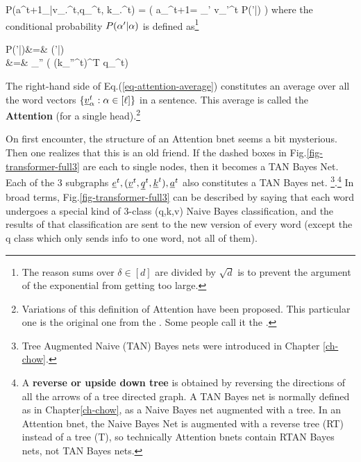 \beq\color{blue}
P(a^{t+1}_\alp|v_.^t,q_\alp^t,
 k_.^t)
=
\indi(\;\;\;
a_\alp^{t+1}=
\sum_{{\alp'}\in[\ell]}
v_{\alp'}^t
P({\alp'}|\alp)
\;\;)
\label{eq-attention-average}
\eeq
where the conditional
probability
$P({\alpha'}|\alpha)$ is
defined as\footnote{
The reason sums over
$\delta\in[d]$ are divided by
$\sqrt{d}$ is to
prevent the argument of
the exponential from getting too
large.
}

\beqa
P({\alp'}|\alp)&=&
\softmax{}(\alp'|\alp)
\\
&=&
{\sum_{\alp''\in [\ell]}
\exp\left(
(k_{\alp''}^t)^T q_\alp^t\right)}
\eeqa

The right-hand side of Eq.(\ref{eq-attention-average})
constitutes an average over
all the word vectors $\{\rvv_\alp^t: \alp\in[\ell]\}$
in a sentence.
This average is called the {\bf Attention}
(for a single head).\footnote{Variations
of this definition of Attention
have been proposed. This particular one
is the original
one from the . Some people
call it the .}

\beq
{}
\eeq



On first encounter, the structure of an Attention bnet
seems a bit mysterious. Then one realizes that this is
an old friend.
If the dashed  boxes in
Fig.\ref{fig-transformer-full3} are each  to single nodes,
then it becomes a TAN Bayes Net. Each of the 3 subgraphs $\rve^t, (\rvv^t, \rvq^t, \rvk^t), \rva^t $
also constitutes a TAN Bayes net. \footnote{Tree Augmented Naive (TAN) Bayes nets
were introduced in Chapter \ref{ch-chow}.}.\footnote{A {\bf reverse or upside down tree} is obtained by reversing the directions of all the arrows of a tree directed graph. A TAN Bayes net is normally defined as in Chapter\ref{ch-chow}, as a Naive Bayes net augmented with a tree. In an Attention bnet, the Naive Bayes Net is augmented with a reverse tree (RT) instead of a tree (T), so technically Attention bnets contain RTAN Bayes nets, not TAN Bayes nets. }
In broad terms, Fig.\ref{fig-transformer-full3}
can be described by saying that
each word undergoes a special
kind of 3-class (q,k,v) Naive Bayes
classification,
and the results of that classification
are sent to the new version of every word (except the q class which only sends
info to one word, not all of them).

